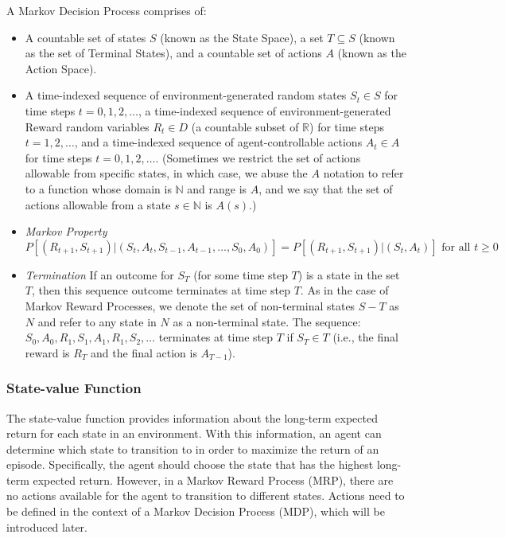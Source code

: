 \documentclass[../xlapes02]{subfiles}
\begin{document}
    \begin{definition}
        A Markov Decision Process comprises of:
        \begin{itemize}
            \item A countable set of states $S$ (known as the State Space), a set $T \subseteq S$ (known as the set of Terminal States), and a countable set of actions $A$ (known as the Action Space).
            \item A time-indexed sequence of environment-generated random states $S_t \in S$ for time steps $t = 0, 1, 2, \ldots$, a time-indexed sequence of environment-generated Reward random variables $R_t \in D$ (a countable subset of $\mathbb{R}$) for time steps $t = 1, 2, \ldots$, and a time-indexed sequence of agent-controllable actions $A_t \in A$ for time steps $t = 0, 1, 2, \ldots$. (Sometimes we restrict the set of actions allowable from specific states, in which case, we abuse the $A$ notation to refer to a function whose domain is $\mathbb{N}$ and range is $A$, and we say that the set of actions allowable from a state $s \in \mathbb{N}$ is $A(s)$.)
            \item \emph{Markov Property}
            \[
                P[(R_{t+1}, S_{t+1})|(S_t, A_t, S_{t-1}, A_{t-1}, \ldots , S_0, A_0)] = P[(R_{t+1}, S_{t+1})|(S_t, A_t)] \text{ for all } t \geq 0
            \]
            \item \emph{Termination} If an outcome for $S_T$ (for some time step $T$) is a state in the set $T$, then this sequence outcome terminates at time step $T$. As in the case of Markov Reward Processes, we denote the set of non-terminal states $S - T$ as $N$ and refer to any state in $N$ as a non-terminal state. The sequence: $S_0, A_0, R_1, S_1, A_1, R_1, S_2, \ldots$ terminates at time step $T$ if $S_T \in T$ (i.e., the final reward is $R_T$ and the final action is $A_{T-1}$).
        \end{itemize}
    \end{definition}

    \subsubsection{State-value Function}\label{subsubsec:state-value-function}
    The state-value function provides information about the long-term expected return for each state in an environment. With this information, an agent can determine which state to transition to in order to maximize the return of an episode. Specifically, the agent should choose the state that has the highest long-term expected return. However, in a Markov Reward Process (MRP), there are no actions available for the agent to transition to different states. Actions need to be defined in the context of a Markov Decision Process (MDP), which will be introduced later.
\end{document}
